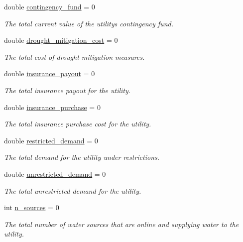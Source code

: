 \begin{DoxyCompactItemize}
double \mbox{\hyperlink{classUtility_a24ac3a2a8609d922cbf99292a9ea40e6}{contingency\+\_\+fund}} = 0
\begin{DoxyCompactList}\small\item\em The total current value of the utility\textquotesingle{}s contingency fund. \end{DoxyCompactList}\item 
double \mbox{\hyperlink{classUtility_aec75cb2903dc25aa2743b9a8cf1271da}{drought\+\_\+mitigation\+\_\+cost}} = 0
\begin{DoxyCompactList}\small\item\em The total cost of drought mitigation measures. \end{DoxyCompactList}\item 
double \mbox{\hyperlink{classUtility_a833681a1110eca06030e8cca742708fb}{insurance\+\_\+payout}} = 0
\begin{DoxyCompactList}\small\item\em The total insurance payout for the utility. \end{DoxyCompactList}\item 
double \mbox{\hyperlink{classUtility_a16b9ac7474fb956679a5a6be82efdf46}{insurance\+\_\+purchase}} = 0
\begin{DoxyCompactList}\small\item\em The total insurance purchase cost for the utility. \end{DoxyCompactList}\item 
double \mbox{\hyperlink{classUtility_aa78701b34a33088dfe3677eca579617e}{restricted\+\_\+demand}} = 0
\begin{DoxyCompactList}\small\item\em The total demand for the utility under restrictions. \end{DoxyCompactList}\item 
double \mbox{\hyperlink{classUtility_a5f981ceeba0b50298b5ad2d463bf4f40}{unrestricted\+\_\+demand}} = 0
\begin{DoxyCompactList}\small\item\em The total unrestricted demand for the utility. \end{DoxyCompactList}\item 
int \mbox{\hyperlink{classUtility_ac8ca6a82c340f78c539302dc87832a6e}{n\+\_\+sources}} = 0
\begin{DoxyCompactList}\small\item\em The total number of water sources that are online and supplying water to the utility. \end{DoxyCompactList}\item 

\end{DoxyCompactItemize}
